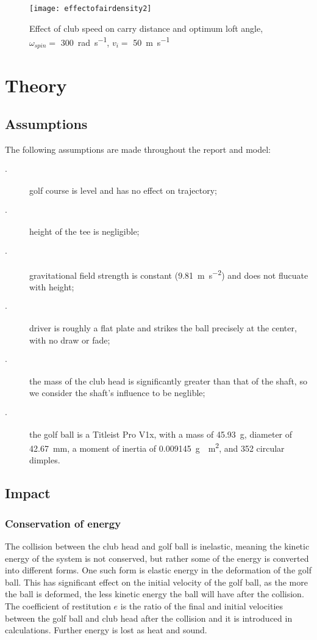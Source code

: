 \documentclass[12pt]{article}
\begin{document}
\begin{figure}[H]
\centering
\caption{Effect of club speed on carry distance and optimum loft angle, $\omega_{spin}=$ \SI{300}{\radian\per\second}, $v_i =$ \SI{50}{\metre\per\second}}
\texttt{[image: effectofairdensity2]}
\end{figure}








\section{Theory}

\subsection{Assumptions}
The following assumptions are made throughout the report and model:
\begin{description}
  \item[$\cdot$] golf course is level and has no effect on trajectory;
  \item[$\cdot$] height of the tee is negligible;
  \item[$\cdot$] gravitational field strength is constant (\SI{9.81}{\metre\per\second^{2}}) and does not flucuate with height;
  \item[$\cdot$] driver is roughly a flat plate and strikes the ball precisely at the center, with no draw or fade;
  \item[$\cdot$] the mass of the club head is significantly greater than that of the shaft, so we consider the shaft's influence to be neglible;
  \item[$\cdot$] the golf ball is a Titleist Pro V1x, with a mass of \SI{45.93}{\gram}, diameter of \SI{42.67}{\milli\metre}, a moment of inertia of \SI{0.009145}{\gram\cdot\metre^2}, and 352 circular dimples.
\end{description}

\subsection{Impact}
\subsubsection{Conservation of energy}
The collision between the club head and golf ball is inelastic, meaning the kinetic energy of the system is not conserved, but rather some of the energy is converted into different forms. One such form is elastic energy in the deformation of the golf ball. This has significant effect on the initial velocity of the golf ball, as the more the ball is deformed, the less kinetic energy the ball will have after the collision. The coefficient of restitution $e$ is the ratio of the final and initial velocities between the golf ball and club head after the collision and it is introduced in calculations. Further energy is lost as heat and sound.
\end{document}
